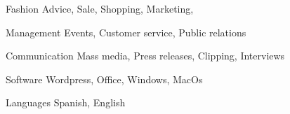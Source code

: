 

\begin{cvskills}

  \cvskill
    {Fashion} %
    {Advice, Sale, Shopping, Marketing, } %

  \cvskill
    {Management} %
    {Events, Customer service, Public relations} %

  \cvskill
    {Communication} %
    {Mass media, Press releases, Clipping, Interviews} %

  \cvskill
    {Software} %
    {Wordpress, Office, Windows, MacOs} %

  \cvskill
    {Languages} %
    {Spanish, English} %

\end{cvskills}

